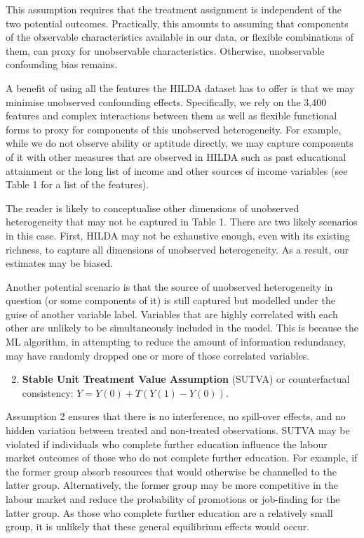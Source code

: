 \documentclass[12pt, a4paper]{article}
\begin{document}
This assumption requires that the treatment assignment is independent of the two potential outcomes. Practically, this amounts to assuming that components of the observable characteristics available in our data, or flexible combinations of them, can proxy for unobservable characteristics. Otherwise, unobservable confounding bias remains.

A benefit of using all the features the HILDA dataset has to offer is that we may minimise unobserved confounding effects. Specifically, we rely on the 3,400 features and complex interactions between them as well as flexible functional forms to proxy for components of this unobserved heterogeneity. For example, while we do not observe ability or aptitude directly, we may capture components of it with other measures that are observed in HILDA such as past educational attainment or the long list of income and other sources of income variables (see Table 1 for a list of the features). 

The reader is likely to conceptualise other dimensions of unobserved heterogeneity that may not be captured in Table 1. There are two likely scenarios in this case. First, HILDA may not be exhaustive enough, even with its existing richness, to capture all dimensions of unobserved heterogeneity. As a result, our estimates may be biased. 

Another potential scenario is that the source of unobserved heterogeneity in question (or some components of it) is still captured but modelled under the guise of another variable label. Variables that are highly correlated with each other are unlikely to be simultaneously included in the model. This is because the ML algorithm, in attempting to reduce the amount of information redundancy, may have randomly dropped one or more of those correlated variables. 

\begin{enumerate}
  \setcounter{enumi}{1}
  \item \textbf{Stable Unit Treatment Value Assumption} (SUTVA) or counterfactual consistency: $Y = Y(0) +T(Y(1) - Y(0))$. 
\end{enumerate}  

Assumption 2 ensures that there is no interference, no spill-over effects, and no hidden variation between treated and non-treated observations. SUTVA may be violated if individuals who complete further education influence the labour market outcomes of those who do not complete further education. For example, if the former group absorb resources that would otherwise be channelled to the latter group. Alternatively, the former group may be more competitive in the labour market and reduce the probability of promotions or job-finding for the latter group. As those who complete further education are a relatively small group, it is unlikely that these general equilibrium effects would occur. 
\end{document}

